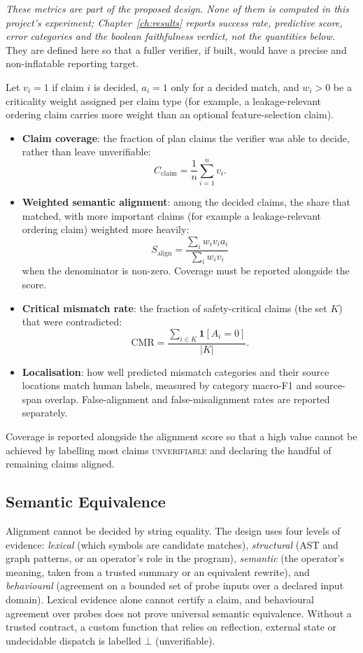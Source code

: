 \emph{These metrics are part of the proposed design. None of them is
computed in this project's experiment; Chapter~\ref{ch:results} reports
success rate, predictive score, error categories and the boolean
faithfulness verdict, not the quantities below.} They are defined here
so that a fuller verifier, if built, would have a precise and
non-inflatable reporting target.

Let $v_i = 1$ if claim $i$ is decided, $a_i = 1$ only for a decided
match, and $w_i > 0$ be a criticality weight assigned per claim type
(for example, a leakage-relevant ordering claim carries more weight
than an optional feature-selection claim).

\begin{itemize}
    \item \textbf{Claim coverage}: the fraction of plan claims the
    verifier was able to decide, rather than leave unverifiable:
    \[
    C_{\mathrm{claim}} = \frac{1}{n}\sum_{i=1}^{n} v_i.
    \]
    \item \textbf{Weighted semantic alignment}: among the decided
    claims, the share that matched, with more important claims (for
    example a leakage-relevant ordering claim) weighted more heavily:
    \[
    S_{\mathrm{align}} = \frac{\sum_i w_i v_i a_i}{\sum_i w_i v_i}
    \]
    when the denominator is non-zero. Coverage must be reported
    alongside the score.
    \item \textbf{Critical mismatch rate}: the fraction of
    safety-critical claims (the set $K$) that were contradicted:
    \[
    \mathrm{CMR} = \frac{\sum_{i\in K}\mathbf{1}[A_i = 0]}{|K|}.
    \]
    \item \textbf{Localisation}: how well predicted mismatch
    categories and their source locations match human labels, measured
    by category macro-F1 and source-span overlap. False-alignment
    and false-misalignment rates are reported separately.
\end{itemize}

Coverage is reported alongside the alignment score so that a high
value cannot be achieved by labelling most claims
\textsc{unverifiable} and declaring the handful of remaining claims
aligned.

\subsection{Semantic Equivalence}

Alignment cannot be decided by string equality. The design uses four
levels of evidence: \emph{lexical} (which symbols are candidate
matches), \emph{structural} (AST and graph patterns, or an operator's
role in the program), \emph{semantic} (the operator's meaning, taken
from a trusted summary or an equivalent rewrite), and
\emph{behavioural} (agreement on a bounded set of probe inputs over a
declared input domain). Lexical evidence alone cannot certify a claim,
and behavioural agreement over probes does not prove universal
semantic equivalence. Without a trusted contract, a custom function
that relies on reflection, external state or undecidable dispatch is
labelled $\bot$ (unverifiable).

